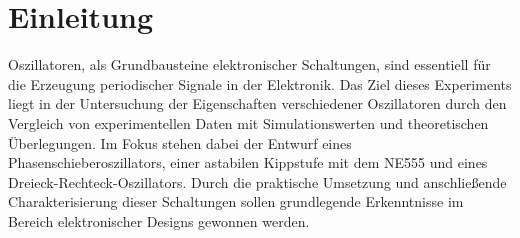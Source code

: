 \section{Einleitung}



Oszillatoren, als Grundbausteine elektronischer Schaltungen, sind essentiell für die Erzeugung periodischer Signale in der Elektronik. Das Ziel dieses Experiments liegt in der Untersuchung der Eigenschaften verschiedener Oszillatoren durch den Vergleich von experimentellen Daten mit Simulationswerten und theoretischen Überlegungen. Im Fokus stehen dabei der Entwurf eines Phasenschieberoszillators, einer astabilen Kippstufe mit dem NE555 und eines Dreieck-Rechteck-Oszillators. Durch die praktische Umsetzung und anschließende Charakterisierung dieser Schaltungen sollen grundlegende Erkenntnisse im Bereich elektronischer Designs gewonnen werden.






